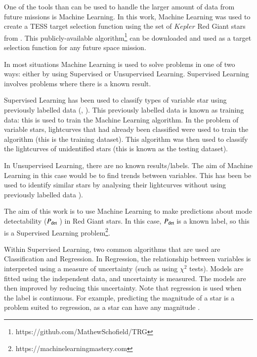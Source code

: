 \documentclass[a4paper,fleqn,usenatbib,useAMS]{mnras}
\newcommand{\pdet}{\ensuremath{P_{\rm det}\:}}
\begin{document}

One of the tools than can be used to handle the larger amount of data from future missions is Machine Learning. In this work, Machine Learning was used to create a TESS target selection function using the set of $Kepler$ Red Giant stars from \citet{davies_asteroseismology_2016}. This publicly-available algorithm\footnote{https://github.com/MathewSchofield/TRG} can be downloaded and used as a target selection function for any future space mission.

In most situations Machine Learning is used to solve problems in one of two ways: either by using Supervised or Unsupervised Learning. Supervised Learning involves problems where there is a known result. 

Supervised Learning has been used to classify types of variable star using previously labelled data (\citet{nun_supervised_2014}, \citet{elorrieta_machine_2016}). This previously labelled data is known as training data: this is used to train the Machine Learning algorithm. In the problem of variable stars, lightcurves that had already been classified were used to train the algorithm (this is the training dataset). This algorithm was then used to classify the lightcurves of unidentified stars (this is known as the testing dataset).

In Unsupervised Learning, there are no known results/labels. The aim of Machine Learning in this case would be to find trends between variables. This has been be used to identify similar stars by analysing their lightcurves without using previously labelled data \citep{valenzuela_unsupervised_2018}).

The aim of this work is to use Machine Learning to make predictions about mode detectability (\pdet) in Red Giant stars. In this case, \pdet is a known label, so this is a Supervised Learning problem\footnote{https://machinelearningmastery.com}.

Within Supervised Learning, two common algorithms that are used are Classification and Regression. In Regression, the relationship between variables is interpreted using a measure of uncertainty (such as using $\chi^{2}$ tests). Models are fitted using the independent data, and uncertainty is measured. The models are then improved by reducing this uncertainty. Note that regression is used when the label is continuous. For example, predicting the magnitude of a star is a problem suited to regression, as a star can have any magnitude \citep{steinhardt_nonparametric_2018}.
\end{document}
